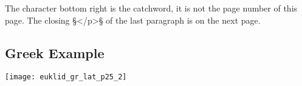 \begin{note}
The character bottom right is the catchword, it is not the page number of this page. The closing §</p>§ of the last paragraph is on the next page.

\end{note}

\vfill


\tocspace
\subsection{Greek Example}
\label{section greek example}

\texttt{[image: euklid\_gr\_lat\_p25\_2]}
\clearpage

